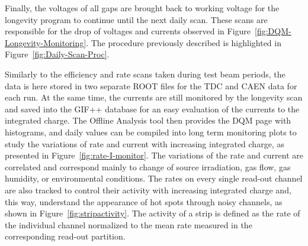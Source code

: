 	Finally, the voltages of all gaps are brought back to working voltage for the longevity program to continue until the next daily scan. These scans are responsible for the drop of voltages and currents observed in Figure~\ref{fig:DQM-Longevity-Monitoring}. The procedure previously described is highlighted in Figure~\ref{fig:Daily-Scan-Proc}. 
	
	Similarly to the efficiency and rate scans taken during test beam periods, the data is here stored in two separate ROOT files for the TDC and CAEN data for each run. At the same time, the currents are still monitored by the longevity scan and saved into the GIF++ database for an easy evaluation of the currents to the integrated charge. The Offline Analysis tool then provides the DQM page with histograms, and daily values can be compiled into long term monitoring plots to study the variations of rate and current with increasing integrated charge, as presented in Figure~\ref{fig:rate-I-monitor}. The variations of the rate and current are correlated and correspond mainly to change of source irradiation, gas flow, gas humidity, or environmental conditions. The rates on every single read-out channel are also tracked to control their activity with increasing integrated charge and, this way, understand the appearance of hot spots through noisy channels, as shown in Figure~\ref{fig:stripactivity}. The activity of a strip is defined as the rate of the individual channel normalized to the mean rate measured in the corresponding read-out partition.

